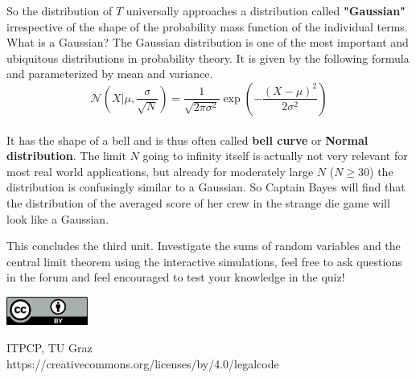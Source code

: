 \documentclass[12pt, a4paper]{scrartcl}
\begin{document}
So the distribution of $T$ universally approaches a distribution called  \textbf{"Gaussian"} irrespective of the shape of the probability mass function of the individual terms.\\
What is a Gaussian?
The Gaussian distribution is one of the most important and ubiquitous distributions in probability theory. It is given by the following formula and parameterized by mean and variance.
\begin{equation*}\boxed{
\mathcal{N}(X|\mu, \frac{\sigma}{\sqrt{N}})=\frac{1}{\sqrt{2\pi \sigma ^2}}\exp\left(-\frac{(X-\mu)^2}{2\sigma^2}\right)
}\end{equation*}\\
It has the shape of a bell and is thus often called  \textbf{bell curve} or  \textbf{Normal distribution}.
The limit $N$ going to infinity itself is actually not very relevant for most real world applications, but already for moderately large $N$ ($N\geq 30$) the distribution is confusingly similar to a Gaussian. 
So Captain Bayes will find that the distribution of the averaged score of her crew in the strange die game will look like a Gaussian.


This concludes the third unit. Investigate the sums of random variables and the central limit theorem using the interactive simulations,  feel free to ask questions in the forum and feel encouraged to test your knowledge in the quiz!



\vspace{2cm}
\begin{minipage}[t]{1\textwidth}
	\raggedleft
	\centering
	\includegraphics[width = 0.20\textwidth]{CC-BY_icon}
	\vspace{0.2cm}
	
	\centering
	{\large ITPCP, TU Graz} \\
	https://creativecommons.org/licenses/by/4.0/legalcode
\end{minipage}
\end{document}
